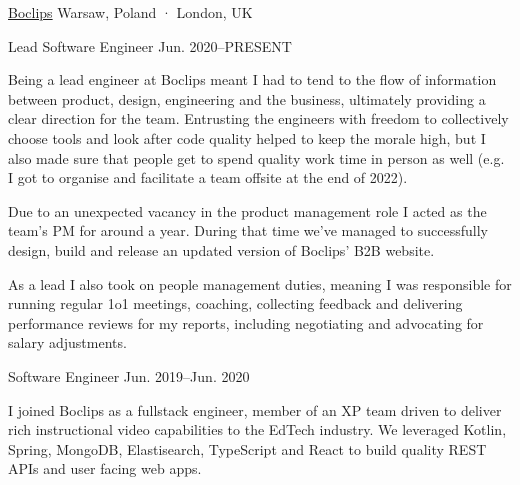 
\begin{cventries}

  \multicventry
    {\href{https://www.boclips.com}{Boclips}} %
    {Warsaw, Poland · London, UK} %
    {
      \multicventryitem
        {Lead Software Engineer} %
        {Jun. 2020–PRESENT} %
        {
          \begin{cvitems} %
            \item {Being a lead engineer at Boclips meant I had to tend to the flow of information between product, design, engineering and the business, ultimately providing a clear direction for the team. Entrusting the engineers with freedom to collectively choose tools and look after code quality helped to keep the morale high, but I also made sure that people get to spend quality work time in person as well (e.g. I got to organise and facilitate a team offsite at the end of 2022).}
            \item {Due to an unexpected vacancy in the product management role I acted as the team's PM for around a year. During that time we've managed to successfully design, build and release an updated version of Boclips' B2B website.}
            \item {As a lead I also took on people management duties, meaning I was responsible for running regular 1o1 meetings, coaching, collecting feedback and delivering performance reviews for my reports, including negotiating and advocating for salary adjustments.}
          \end{cvitems}
        }
      \multicventryitem
        {Software Engineer} %
        {Jun. 2019–Jun. 2020} %
        {
          \begin{cvitems} %
            \item {I joined Boclips as a fullstack engineer, member of an XP team driven to deliver rich instructional video capabilities to the EdTech industry. We leveraged Kotlin, Spring, MongoDB, Elastisearch, TypeScript and React to build quality REST APIs and user facing web apps.}

\end{cvitems}}}
\end{cventries}
